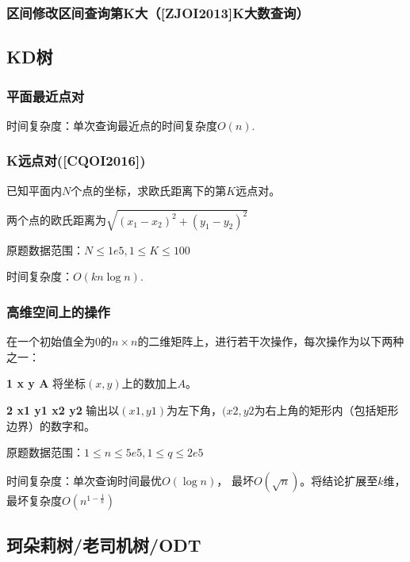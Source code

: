 \documentclass{article}
\begin{document}
\subsubsection{区间修改区间查询第K大（[ZJOI2013]K大数查询）}




\subsection{KD树}
\subsubsection{平面最近点对}
时间复杂度：单次查询最近点的时间复杂度$O(n).$

\subsubsection{K远点对([CQOI2016])}
已知平面内$N$个点的坐标，求欧氏距离下的第$K$远点对。\par
两个点的欧氏距离为$\sqrt{(x_1-x_2)^{2}+(y_1-y_2)^{2}}$\par
原题数据范围：$N\leq 1e5, 1\leq K\leq 100$\par
时间复杂度：$O(kn\log{n}).$

\subsubsection{高维空间上的操作}
在一个初始值全为$0$的$n\times n$的二维矩阵上，进行若干次操作，每次操作为以下两种之一：\par
\textbf{1 x y A} 将坐标$(x,y)$上的数加上$A$。\par
\textbf{2 x1 y1 x2 y2} 输出以$(x1, y1)$为左下角，$(x2, y2$为右上角的矩形内（包括矩形边界）的数字和。\par
原题数据范围：$1\leq n \leq 5e5, 1\leq q \leq 2e5$\par
时间复杂度：单次查询时间最优$O(\log{n})$， 最坏$O(\sqrt{n})$。将结论扩展至$k$维，最坏复杂度$O(n^{1-\frac{1}{k}})$



\subsection{珂朵莉树/老司机树/ODT}
\end{document}
